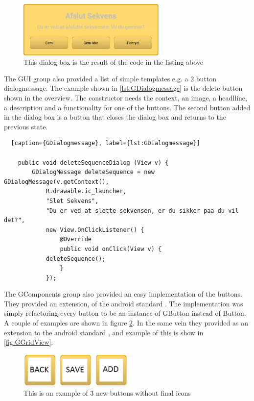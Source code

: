 \begin{figure} [h!]
\centering
\includegraphics[width=0.65\textwidth]{Pics/Sprint2/dialogs/afslutSekvens.png}
\caption{This dialog box is the result of the code in the listing above}
\label{fig:GDialog}
\end{figure}

The GUI group also provided a list of simple templates e.g. a 2 button dialogmessage. The example shown in \ref{lst:GDialogmessage} is the delete button shown in the overview. The constructor needs the context, an image, a headlline, a description and a functionality for one of the buttons. The second button added in the dialog box is a button that closes the dialog box and returns to the previous state.

\begin{lstlisting}  [caption={GDialogmessage}, label={lst:GDialogmessage}]

    public void deleteSequenceDialog (View v) {
        GDialogMessage deleteSequence = new GDialogMessage(v.getContext(),
            R.drawable.ic_launcher,
            "Slet Sekvens",
            "Du er ved at slette sekvensen, er du sikker paa du vil det?",
            new View.OnClickListener() {
                @Override
                public void onClick(View v) {
			deleteSequence();
                }
            });

\end{lstlisting}

The GComponents group also provided an easy implementation of the buttons. They provided an extension,  of the android standard . The implementation was simply refactoring every button to be an instance of GButton instead of Button. A couple of examples are shown in figure \ref{fig:buttons}. In the same vein they provided  as an extension to the android standard , and example of this is show in \ref{fig:GGridView}.

\begin{figure} [h!]
\centering
\includegraphics[width=0.5\textwidth]{Pics/Sprint2/dialogs/backSaveAdd.png}
\caption{This is an example of 3 new buttons without final icons}
\label{fig:buttons}
\end{figure}

